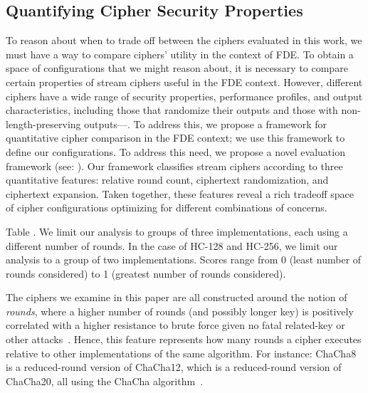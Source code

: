 \subsection{Quantifying Cipher Security Properties}\label{subsec:quantify}

To reason about when to trade off between the ciphers evaluated in this work, we
must have a way to compare ciphers' utility in the context of \sys FDE. To
obtain a space of configurations that we might reason about, it is necessary to
compare certain properties of stream ciphers useful in the FDE context. However,
different ciphers have a wide range of security properties, performance
profiles, and output characteristics, including those that randomize their
outputs and those with non-length-preserving outputs---. To address this, we propose a framework for
quantitative cipher comparison in the FDE context; we use this framework to
define our configurations.  To
address this need, we propose a novel evaluation framework (see:
). Our framework classifies stream ciphers according to
three quantitative features: relative round count, ciphertext randomization, and
ciphertext expansion. Taken together, these features reveal a rich tradeoff
space of cipher configurations optimizing for different combinations of
concerns.

Table  . We limit our analysis to groups of
three implementations, each using a different number of rounds. In the case of
HC-128 and HC-256, we limit our analysis to a group of two implementations.
Scores range from 0 (least number of rounds considered) to 1 (greatest number of
rounds considered).




 The ciphers we examine in this paper are all
constructed around the notion of \emph{rounds}, where a higher number of rounds
(and possibly longer key) is positively correlated with a higher resistance to
brute force given no fatal related-key or other
attacks~\cite{ChaCha-Cryptanalysis}. Hence, this feature represents how many
rounds a cipher executes relative to other implementations of the same
algorithm. For instance: ChaCha8 is a reduced-round version of ChaCha12, which
is a reduced-round version of ChaCha20, all using the ChaCha
algorithm~\cite{ChaCha20,ChaCha-Cryptanalysis}.

